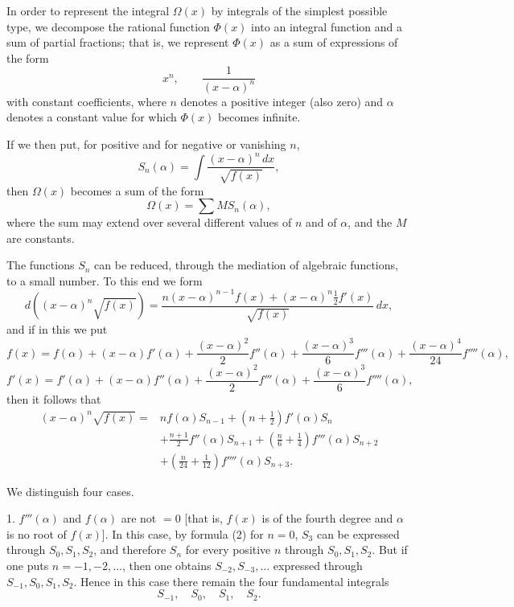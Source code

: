 \documentclass[11pt]{article}
\begin{document}
In order to represent the integral $\Omega(x)$ by integrals of the simplest possible type, we decompose the rational function $\Phi(x)$ into an integral function and a sum of partial fractions; that is, we represent $\Phi(x)$ as a sum of expressions of the form
\[
x^n,\qquad \frac1{(x-\alpha)^n}
\]
with constant coefficients, where $n$ denotes a positive integer (also zero) and $\alpha$ denotes a constant value for which $\Phi(x)$ becomes infinite.

If we then put, for positive and for negative or vanishing $n$,
\begin{equation}
S_n(\alpha)=\int\frac{(x-\alpha)^n\,dx}{\sqrt{f(x)}},
\tag{1}
\end{equation}
then $\Omega(x)$ becomes a sum of the form
\[
\Omega(x)=\sum M S_n(\alpha),
\]
where the sum may extend over several different values of $n$ and of $\alpha$, and the $M$ are constants.

The functions $S_n$ can be reduced, through the mediation of algebraic functions, to a small number. To this end we form
\[
d\!\left((x-\alpha)^n\sqrt{f(x)}\right)
=
\frac{n(x-\alpha)^{n-1}f(x)+(x-\alpha)^n\frac12 f'(x)}
{\sqrt{f(x)}}\,dx,
\]
and if in this we put
\[
f(x)=f(\alpha)+(x-\alpha)f'(\alpha)+\frac{(x-\alpha)^2}{2}f''(\alpha)
+\frac{(x-\alpha)^3}{6}f'''(\alpha)
+\frac{(x-\alpha)^4}{24}f''''(\alpha),
\]
\[
f'(x)=f'(\alpha)+(x-\alpha)f''(\alpha)
+\frac{(x-\alpha)^2}{2}f'''(\alpha)
+\frac{(x-\alpha)^3}{6}f''''(\alpha),
\]
then it follows that
\begin{equation}
\begin{aligned}
(x-\alpha)^n\sqrt{f(x)}
={}& n f(\alpha)S_{n-1}
+\left(n+\frac12\right)f'(\alpha)S_n\\
&+\frac{n+1}{2}f''(\alpha)S_{n+1}
+\left(\frac n6+\frac14\right)f'''(\alpha)S_{n+2}\\
&+\left(\frac n{24}+\frac1{12}\right)f''''(\alpha)S_{n+3}.
\end{aligned}
\tag{2}
\end{equation}

We distinguish four cases.

1. $f'''(\alpha)$ and $f(\alpha)$ are not $=0$ [that is, $f(x)$ is of the fourth degree and $\alpha$ is no root of $f(x)$]. In this case, by formula (2) for $n=0$, $S_3$ can be expressed through $S_0,S_1,S_2$, and therefore $S_n$ for every positive $n$ through $S_0,S_1,S_2$. But if one puts $n=-1,-2,\ldots$, then one obtains $S_{-2},S_{-3},\ldots$ expressed through $S_{-1},S_0,S_1,S_2$. Hence in this case there remain the four fundamental integrals
\[
S_{-1},\quad S_0,\quad S_1,\quad S_2.
\]
\end{document}
